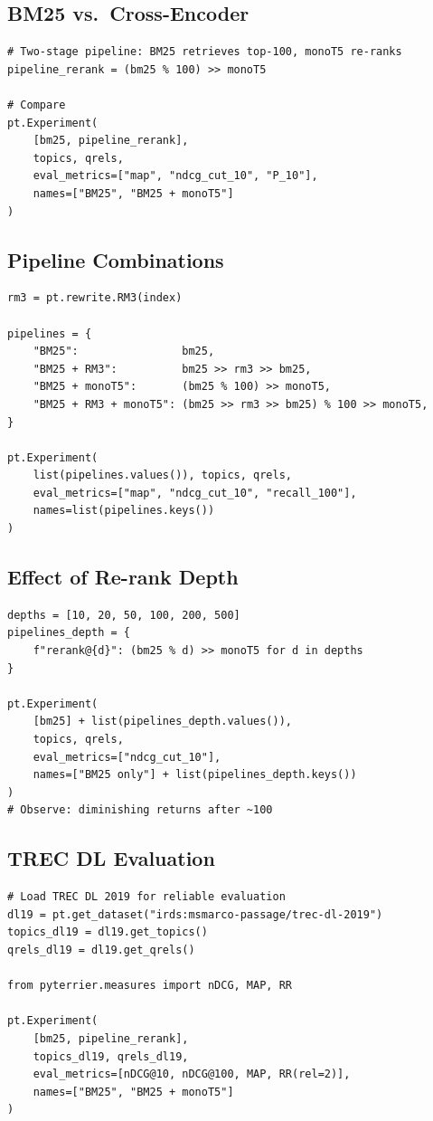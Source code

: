 \documentclass[11pt,a4paper]{article}
\theoremstyle{definition}
\theoremstyle{plain}
\begin{document}
\subsection{BM25 vs.\ Cross-Encoder}

\begin{lstlisting}
# Two-stage pipeline: BM25 retrieves top-100, monoT5 re-ranks
pipeline_rerank = (bm25 % 100) >> monoT5

# Compare
pt.Experiment(
    [bm25, pipeline_rerank],
    topics, qrels,
    eval_metrics=["map", "ndcg_cut_10", "P_10"],
    names=["BM25", "BM25 + monoT5"]
)
\end{lstlisting}

\subsection{Pipeline Combinations}

\begin{lstlisting}
rm3 = pt.rewrite.RM3(index)

pipelines = {
    "BM25":                bm25,
    "BM25 + RM3":          bm25 >> rm3 >> bm25,
    "BM25 + monoT5":       (bm25 % 100) >> monoT5,
    "BM25 + RM3 + monoT5": (bm25 >> rm3 >> bm25) % 100 >> monoT5,
}

pt.Experiment(
    list(pipelines.values()), topics, qrels,
    eval_metrics=["map", "ndcg_cut_10", "recall_100"],
    names=list(pipelines.keys())
)
\end{lstlisting}

\subsection{Effect of Re-rank Depth}

\begin{lstlisting}
depths = [10, 20, 50, 100, 200, 500]
pipelines_depth = {
    f"rerank@{d}": (bm25 % d) >> monoT5 for d in depths
}

pt.Experiment(
    [bm25] + list(pipelines_depth.values()),
    topics, qrels,
    eval_metrics=["ndcg_cut_10"],
    names=["BM25 only"] + list(pipelines_depth.keys())
)
# Observe: diminishing returns after ~100
\end{lstlisting}

\subsection{TREC DL Evaluation}

\begin{lstlisting}
# Load TREC DL 2019 for reliable evaluation
dl19 = pt.get_dataset("irds:msmarco-passage/trec-dl-2019")
topics_dl19 = dl19.get_topics()
qrels_dl19 = dl19.get_qrels()

from pyterrier.measures import nDCG, MAP, RR

pt.Experiment(
    [bm25, pipeline_rerank],
    topics_dl19, qrels_dl19,
    eval_metrics=[nDCG@10, nDCG@100, MAP, RR(rel=2)],
    names=["BM25", "BM25 + monoT5"]
)
\end{lstlisting}
\end{document}
